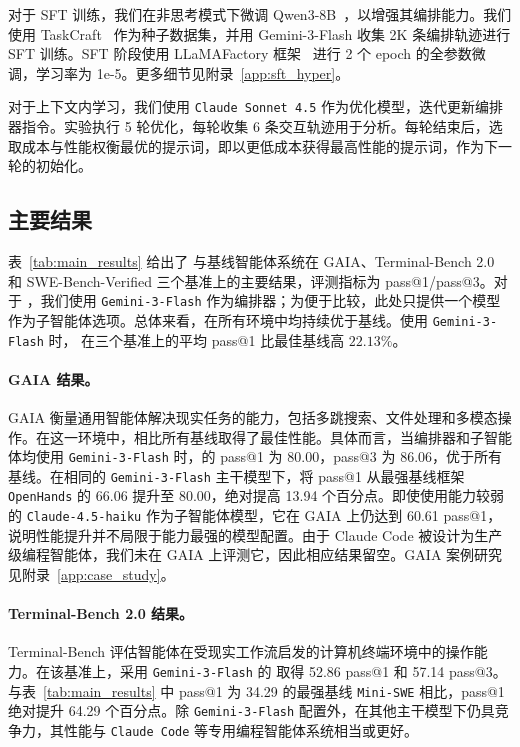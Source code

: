 对于 SFT 训练，我们在非思考模式下微调 Qwen3-8B~\cite{yang2025qwen3}，以增强其编排能力。我们使用 TaskCraft~\cite{shi2025taskcraft} 作为种子数据集，并用 Gemini-3-Flash 收集 2K 条编排轨迹进行 SFT 训练。SFT 阶段使用 LLaMAFactory 框架~\cite{zheng2024llamafactory} 进行 2 个 epoch 的全参数微调，学习率为 1e-5。更多细节见附录~\ref{app:sft_hyper}。

对于上下文内学习，我们使用 \texttt{Claude Sonnet 4.5} 作为优化模型，迭代更新编排器指令。实验执行 5 轮优化，每轮收集 6 条交互轨迹用于分析。每轮结束后，选取成本与性能权衡最优的提示词，即以更低成本获得最高性能的提示词，作为下一轮的初始化。

\subsection{主要结果}
\label{sec:main_results}
表~\ref{tab:main_results} 给出了 \our 与基线智能体系统在 GAIA、Terminal-Bench 2.0 和 SWE-Bench-Verified 三个基准上的主要结果，评测指标为 pass@1/pass@3。对于 \our，我们使用 \texttt{Gemini-3-Flash} 作为编排器；为便于比较，此处只提供一个模型作为子智能体选项。总体来看，\our 在所有环境中均持续优于基线。使用 \texttt{Gemini-3-Flash} 时，\our{} 在三个基准上的平均 pass@1 比最佳基线高 $22.13\%$。

\paragraph{GAIA 结果。}
GAIA 衡量通用智能体解决现实任务的能力，包括多跳搜索、文件处理和多模态操作。在这一环境中，\our 相比所有基线取得了最佳性能。具体而言，当编排器和子智能体均使用 \texttt{Gemini-3-Flash} 时，\our 的 pass@1 为 80.00，pass@3 为 86.06，优于所有基线。在相同的 \texttt{Gemini-3-Flash} 主干模型下，\our 将 pass@1 从最强基线框架 \texttt{OpenHands} 的 66.06 提升至 80.00，绝对提高 13.94 个百分点。即使使用能力较弱的 \texttt{Claude-4.5-haiku} 作为子智能体模型，它在 GAIA 上仍达到 60.61 pass@1，说明性能提升并不局限于能力最强的模型配置。由于 Claude Code 被设计为生产级编程智能体，我们未在 GAIA 上评测它，因此相应结果留空。GAIA 案例研究见附录~\ref{app:case_study}。

\paragraph{Terminal-Bench 2.0 结果。}
Terminal-Bench 评估智能体在受现实工作流启发的计算机终端环境中的操作能力。在该基准上，采用 \texttt{Gemini-3-Flash} 的 \our 取得 52.86 pass@1 和 57.14 pass@3。与表~\ref{tab:main_results} 中 pass@1 为 34.29 的最强基线 \texttt{Mini-SWE} 相比，pass@1 绝对提升 64.29 个百分点。除 \texttt{Gemini-3-Flash} 配置外，\our 在其他主干模型下仍具竞争力，其性能与 \texttt{Claude Code} 等专用编程智能体系统相当或更好。


